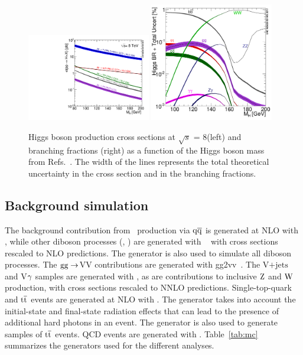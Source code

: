\documentclass[12pt,twoside,a4paper,cmspaper,final,collab]{cms-tdr}
\begin{document}
\begin{figure}[tbp]
  \begin{center}
    \includegraphics[width=0.48\textwidth]{figures/Higgs_XS_8TeV_LM200.pdf}
    \includegraphics[width=0.48\textwidth]{figures/BR_lm_quadrato.pdf}
    \caption{Higgs boson production cross sections  at $\sqrt{s}$ = 8\TeV (left) and branching fractions (right) as a function of the Higgs
boson mass from Refs.~\cite{LHCHiggsCrossSectionWorkingGroup:2011ti,Dittmaier:2012vm}. The width of the lines
represents the total theoretical uncertainty in the cross section and in the branching fractions.}
    \label{fig:xs_and_br_lm}
  \end{center}
\end{figure}

\subsection{Background simulation}

The background contribution from \cPZ\cPZ\ production via $\mathrm{q}\mathrm{\overline{q}}$ is generated at NLO with {\POWHEG}, while
other diboson processes (\PW\PW, \PW\cPZ) are generated with {\MADGRAPH}~\cite{Alwall:2011uj,Alwall:2007st}
with cross sections rescaled to NLO predictions. The {\PYTHIA} generator is also used to simulate all diboson processes.
The $\mathrm{g}\mathrm{g} \rightarrow$VV
contributions are generated with {\sc gg2vv}~\cite{Binoth:2008pr}.
The  V$+\text{jets}$  and V$\gamma$ samples
are generated with {\MADGRAPH}, as are contributions to inclusive $\mathrm{Z}$ and  $\mathrm{W}$ production,
with cross sections rescaled to NNLO predictions.
Single-top-quark and $\mathrm{t}\overline{\mathrm{t}}$ events are generated at NLO with {\POWHEG}.
 The {\PYTHIA} generator takes into account the  initial-state and final-state radiation effects that
can lead to the presence of additional hard photons in an event.
The {\MADGRAPH} generator is also used to generate samples of $\mathrm{t}\overline{\mathrm{t}}$ events.
QCD events are generated with {\PYTHIA}.
Table~\ref{tab:mc} summarizes the generators used for the different analyses.
\end{document}
